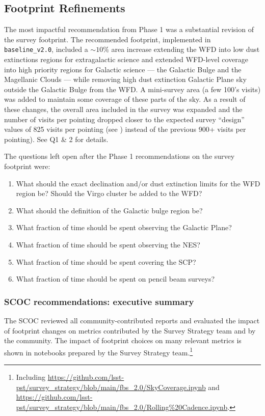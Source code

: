 \subsection{Footprint Refinements}\label{q:Footprint} 

The most impactful recommendation from Phase 1 was a substantial revision of the survey footprint. The recommended footprint, implemented in \texttt{baseline\_v2.0}, included a $\sim10\%$ area increase extending the WFD into low dust extinctions regions for extragalactic science and extended WFD-level coverage into high priority regions for Galactic science --- the Galactic Bulge and the Magellanic Clouds --- while removing high dust extinction Galactic Plane sky outside the Galactic Bulge from the WFD. A mini-survey area (a few 100's visits) was added to maintain some coverage of these parts of the sky. As a result of these changes, the overall area included in the survey was expanded and the number of visits per pointing dropped closer to the expected survey ``design'' values of 825 visits per pointing (see ) instead of the previous 900+ visits per pointing). See  Q1 \& 2 for details. 

The questions left open after the Phase 1 recommendations on the survey footprint were: 

\begin{enumerate}
\item What should the exact declination and/or dust extinction limits for the WFD region be? Should the Virgo cluster be added to the WFD?
\item What should the definition of the Galactic bulge region be? 
\item What fraction of time should be spent observing the Galactic Plane?
\item What fraction of time should be spent observing the NES?
\item What fraction of time should be spent covering the SCP?
\item What fraction of time should be spent on pencil beam surveys?
\end{enumerate}

\subsubsection{SCOC recommendations: executive summary}\label{rec:footprint_es}

 The SCOC reviewed all community-contributed reports and evaluated the impact of footprint changes on metrics contributed by the Survey Strategy team and by the community. The impact of footprint choices on many relevant metrics is shown in notebooks prepared by the Survey Strategy team.\footnote{Including \url{https://github.com/lsst-pst/survey_strategy/blob/main/fbs_2.0/SkyCoverage.ipynb} and \url{https://github.com/lsst-pst/survey_strategy/blob/main/fbs_2.0/Rolling\%20Cadence.ipynb}.}

